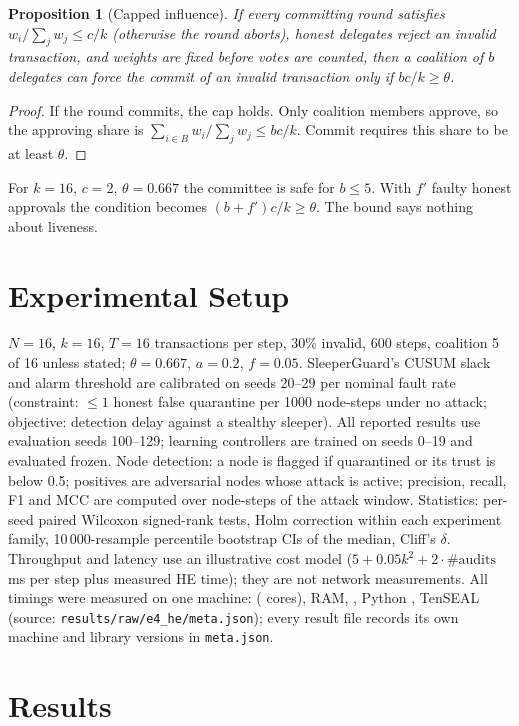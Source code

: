 \documentclass[conference]{IEEEtran}
\newtheorem{proposition}{Proposition}
\begin{document}
\begin{proposition}[Capped influence]\label{prop:safety}
If every committing round satisfies $w_i/\sum_j w_j\le c/k$ (otherwise the round aborts), honest delegates
reject an invalid transaction, and weights are fixed before votes are counted, then a coalition of $b$
delegates can force the commit of an invalid transaction only if $bc/k\ge\theta$.
\end{proposition}
\begin{proof}
If the round commits, the cap holds. Only coalition members approve, so the approving share is
$\sum_{i\in B} w_i/\sum_j w_j\le bc/k$. Commit requires this share to be at least $\theta$.
\end{proof}
For $k=16$, $c=2$, $\theta=0.667$ the committee is safe for $b\le5$. With $f'$ faulty honest approvals the
condition becomes $(b+f')c/k\ge\theta$. The bound says nothing about liveness.

\section{Experimental Setup}
$N=16$, $k=16$, $T=16$ transactions per step, 30\% invalid, 600 steps, coalition 5 of 16 unless stated;
$\theta=0.667$, $a=0.2$, $f=0.05$. SleeperGuard's CUSUM slack and alarm threshold are calibrated on
seeds 20--29 per nominal fault rate (constraint: $\le1$ honest false quarantine per 1000 node-steps under no
attack; objective: detection delay against a stealthy sleeper). All reported results use evaluation seeds
100--129; learning controllers are trained on seeds 0--19 and evaluated frozen. Node detection: a node is
flagged if quarantined or its trust is below 0.5; positives are adversarial nodes whose attack is active;
precision, recall, F1 and MCC are computed over node-steps of the attack window. Statistics: per-seed paired
Wilcoxon signed-rank tests, Holm correction within each experiment family, 10\,000-resample percentile
bootstrap CIs of the median, Cliff's $\delta$. Throughput and latency use an illustrative cost model
($5+0.05k^2+2\cdot\#\text{audits}$ ms per step plus measured HE time); they are not network measurements.
All timings were measured on one machine: \HwCpu{} (\HwCores{} cores), \HwRam{} RAM, \HwOs{},
Python \HwPython{}, TenSEAL \HwTenseal{} (source: \texttt{results/raw/e4\_he/meta.json}); every result file records its
own machine and library versions in \texttt{meta.json}.

\section{Results}

\end{document}
